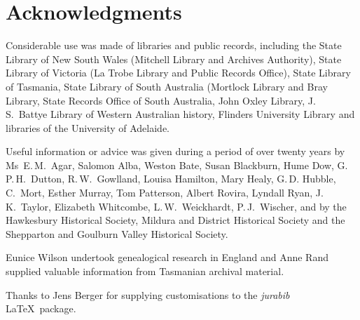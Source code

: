 
\chapter{Acknowledgments}
\label{ch:ack}

Considerable use was made of libraries and public records, including
the State Library of New South Wales (Mitchell Library and Archives
Authority), State Library of Victoria (La Trobe Library and Public
Rec\-ords Office), State Library of Tasmania, State Library of South
Australia (Mortlock Library and Bray Library, State Records Office of
South Australia, John Oxley Library, J.\,S.~Battye Library of Western
Australian history, Flinders University Library and libraries of the
University of Adelaide.

\medskip
Useful information or advice was given during a period of over
twen\-ty years by Ms~E.\,M.~Agar, Salomon Alba, Weston Bate, Susan
Blackburn, Hume Dow, G.\,P.\,H.~Dutton, R.\,W.~Gowlland, Louisa
Hamilton, Mary Healy, G.\,D. Hubble, C.~Mort, Esther Murray, Tom
Patterson, Albert Rovira, Lyndall Ryan, J.\,K.~Taylor, Elizabeth
Whitcombe, L.\,W.~Weickhardt, P.\,J.~Wischer, and by the Hawkesbury
Historical Society, Mildura and District Historical Society and the
Shepparton and Goulburn Valley Historical Society.

\medskip
Eunice Wilson undertook genealogical research in England and Anne Rand
supplied valuable information from Tasmanian archival material.

\bigskip
Thanks to Jens Berger for supplying customisations to the
\textit{jurabib} \LaTeX\ package.
